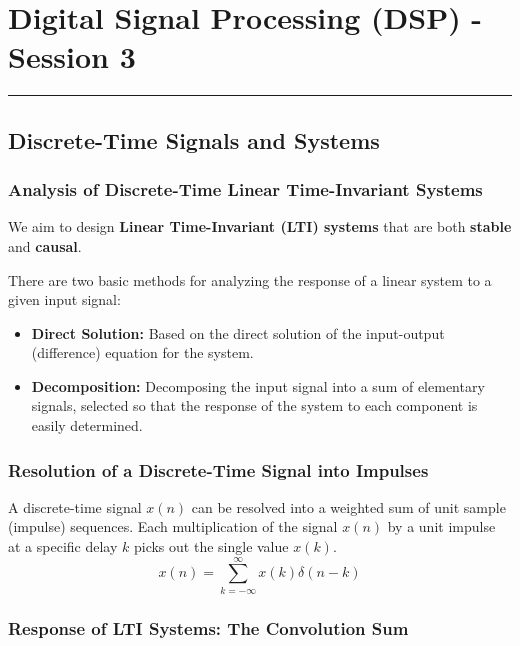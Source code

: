\section{Digital Signal Processing (DSP) - Session
3}\label{digital-signal-processing-dsp---session-3}

\begin{center}\rule{0.5\linewidth}{0.5pt}\end{center}

\subsection{Discrete-Time Signals and
Systems}\label{discrete-time-signals-and-systems}

\subsubsection{Analysis of Discrete-Time Linear Time-Invariant
Systems}\label{analysis-of-discrete-time-linear-time-invariant-systems}

We aim to design \textbf{Linear Time-Invariant (LTI) systems} that are
both \textbf{stable} and \textbf{causal}.

There are two basic methods for analyzing the response of a linear
system to a given input signal:

\begin{itemize}
\tightlist
\item
  \textbf{Direct Solution:} Based on the direct solution of the
  input-output (difference) equation for the system.
\item
  \textbf{Decomposition:} Decomposing the input signal into a sum of
  elementary signals, selected so that the response of the system to
  each component is easily determined.
\end{itemize}

\subsubsection{Resolution of a Discrete-Time Signal into
Impulses}\label{resolution-of-a-discrete-time-signal-into-impulses}

A discrete-time signal \(x(n)\) can be resolved into a weighted sum of
unit sample (impulse) sequences. Each multiplication of the signal
\(x(n)\) by a unit impulse at a specific delay \(k\) picks out the
single value \(x(k)\).
\[x(n) = \sum_{k=-\infty}^{\infty} x(k)\delta(n-k)\]

\subsubsection{Response of LTI Systems: The Convolution
Sum}\label{response-of-lti-systems-the-convolution-sum}

